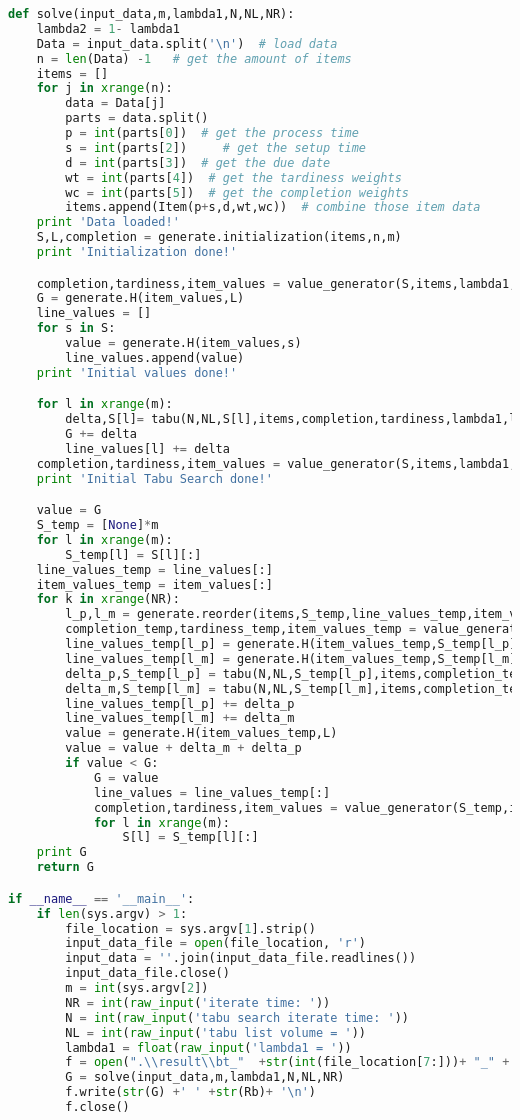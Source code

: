 \begin{lstlisting}[language = Python]
def solve(input_data,m,lambda1,N,NL,NR):
	lambda2 = 1- lambda1
	Data = input_data.split('\n')  # load data
	n = len(Data) -1   # get the amount of items
	items = []
	for j in xrange(n):
		data = Data[j]
		parts = data.split()
		p = int(parts[0])  # get the process time
		s = int(parts[2])	  # get the setup time
		d = int(parts[3])  # get the due date
		wt = int(parts[4])  # get the tardiness weights
		wc = int(parts[5])  # get the completion weights
		items.append(Item(p+s,d,wt,wc))  # combine those item data
	print 'Data loaded!'	
	S,L,completion = generate.initialization(items,n,m)
	print 'Initialization done!'

	completion,tardiness,item_values = value_generator(S,items,lambda1,lambda2)
	G = generate.H(item_values,L)
	line_values = []
	for s in S:
		value = generate.H(item_values,s)
		line_values.append(value)
	print 'Initial values done!'

	for l in xrange(m):
		delta,S[l]= tabu(N,NL,S[l],items,completion,tardiness,lambda1,lambda2)
		G += delta
		line_values[l] += delta
	completion,tardiness,item_values = value_generator(S,items,lambda1,lambda2)
	print 'Initial Tabu Search done!'

	value = G
	S_temp = [None]*m
	for l in xrange(m):
		S_temp[l] = S[l][:]
	line_values_temp = line_values[:]
	item_values_temp = item_values[:]
	for k in xrange(NR):		
		l_p,l_m = generate.reorder(items,S_temp,line_values_temp,item_values_temp)
		completion_temp,tardiness_temp,item_values_temp = value_generator(S_temp,items,lambda1,lambda2)
		line_values_temp[l_p] = generate.H(item_values_temp,S_temp[l_p])
		line_values_temp[l_m] = generate.H(item_values_temp,S_temp[l_m])
		delta_p,S_temp[l_p] = tabu(N,NL,S_temp[l_p],items,completion_temp,tardiness_temp,lambda1,lambda2)
		delta_m,S_temp[l_m] = tabu(N,NL,S_temp[l_m],items,completion_temp,tardiness_temp,lambda1,lambda2)
		line_values_temp[l_p] += delta_p
		line_values_temp[l_m] += delta_m
		value = generate.H(item_values_temp,L)
		value = value + delta_m + delta_p
		if value < G:
			G = value
			line_values = line_values_temp[:]
			completion,tardiness,item_values = value_generator(S_temp,items,lambda1,lambda2)
			for l in xrange(m):
				S[l] = S_temp[l][:]
	print G
	return G

if __name__ == '__main__':
	if len(sys.argv) > 1:
		file_location = sys.argv[1].strip()
		input_data_file = open(file_location, 'r')
		input_data = ''.join(input_data_file.readlines())
		input_data_file.close()
		m = int(sys.argv[2])
		NR = int(raw_input('iterate time: '))
		N = int(raw_input('tabu search iterate time: '))
		NL = int(raw_input('tabu list volume = '))
		lambda1 = float(raw_input('lambda1 = '))
		f = open(".\\result\\bt_"  +str(int(file_location[7:]))+ "_" + str(m) + "_" + str(lambda1),'w')
		G = solve(input_data,m,lambda1,N,NL,NR)
		f.write(str(G) +' ' +str(Rb)+ '\n')
		f.close()
\end{lstlisting}